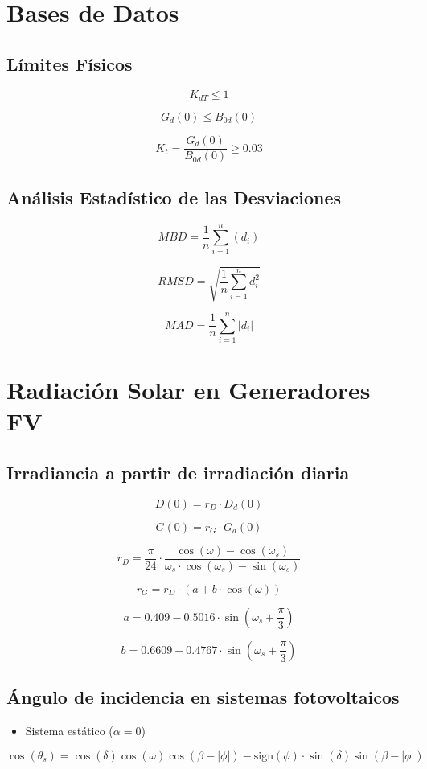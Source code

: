 \documentclass[article, a4paper]{memoir}
\begin{document}
\section{Bases de Datos}
\label{sec:orgdd642d2}

\subsection{Límites Físicos}
\label{sec:org50a0e8a}

\[
  K_{dT} \leq 1
\]

\[
G_d(0) \leq B_{0d}(0)
\]

\[
K_t = \frac{G_d(0)}{B_{0d}(0)} \geq 0.03
\]

\subsection{Análisis Estadístico de las Desviaciones}
\label{sec:org61d1419}

\[
MBD = \frac{1}{n} \sum_{i=1}^n (d_i)
\]

\[
RMSD = \sqrt{\frac{1}{n} \sum_{i=1}^n d_i^2} 
\]

\[
MAD = \frac{1}{n} \sum_{i=1}^n \left|d_i\right| 
\]
\section{Radiación Solar en Generadores FV}
\label{sec:org94f6b04}
\subsection{Irradiancia a partir de irradiación diaria}
\label{sec:org5367fd0}
\[D(0) = r_D \cdot D_{d}(0)\]

\[G(0) = r_G \cdot G_{d}(0)\]

\[
r_D = \frac{\pi}{24}\cdot\frac{\cos(\omega)-\cos(\omega_{s})}{\omega_{s}\cdot\cos(\omega_{s})-\sin(\omega_{s})}
\]

\[r_{G}=r_{D}\cdot\left(a+b\cdot\cos(\omega)\right)\]

\[a=0.409-0.5016\cdot\sin(\omega_{s}+\frac{\pi}{3})\]

\[b=0.6609+0.4767\cdot\sin(\omega_{s}+\frac{\pi}{3})\]
\subsection{Ángulo de incidencia en sistemas fotovoltaicos}
\label{sec:orgc201225}
\begin{itemize}
\item Sistema estático (\(\alpha=0\))
\end{itemize}
\[
\cos(\theta_{s}) = \cos(\delta)\cos(\omega)\cos(\beta-|\phi|)- \mathrm{sign}(\phi)\cdot\sin(\delta)\sin(\beta-|\phi|)
\]
\end{document}

